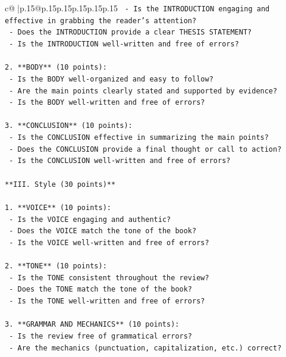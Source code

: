 \documentclass{article}
\begin{document}
{\begin{supertabular}{c@{$\;$}|p{.15\linewidth}@{}p{.15\linewidth}p{.15\linewidth}p{.15\linewidth}p{.15\linewidth}p{.15\linewidth}}
{{{\texttt{   {-} Is the INTRODUCTION engaging and effective in grabbing the reader's attention?} \\
\texttt{   {-} Does the INTRODUCTION provide a clear THESIS STATEMENT?} \\
\texttt{   {-} Is the INTRODUCTION well{-}written and free of errors?} \\
\\ 
\texttt{2. **BODY** (10 points):} \\
\texttt{   {-} Is the BODY well{-}organized and easy to follow?} \\
\texttt{   {-} Are the main points clearly stated and supported by evidence?} \\
\texttt{   {-} Is the BODY well{-}written and free of errors?} \\
\\ 
\texttt{3. **CONCLUSION** (10 points):} \\
\texttt{   {-} Is the CONCLUSION effective in summarizing the main points?} \\
\texttt{   {-} Does the CONCLUSION provide a final thought or call to action?} \\
\texttt{   {-} Is the CONCLUSION well{-}written and free of errors?} \\
\\ 
\texttt{**III. Style (30 points)**} \\
\\ 
\texttt{1. **VOICE** (10 points):} \\
\texttt{   {-} Is the VOICE engaging and authentic?} \\
\texttt{   {-} Does the VOICE match the tone of the book?} \\
\texttt{   {-} Is the VOICE well{-}written and free of errors?} \\
\\ 
\texttt{2. **TONE** (10 points):} \\
\texttt{   {-} Is the TONE consistent throughout the review?} \\
\texttt{   {-} Does the TONE match the tone of the book?} \\
\texttt{   {-} Is the TONE well{-}written and free of errors?} \\
\\ 
\texttt{3. **GRAMMAR AND MECHANICS** (10 points):} \\
\texttt{   {-} Is the review free of grammatical errors?} \\
\texttt{   {-} Are the mechanics (punctuation, capitalization, etc.) correct?} \\
}}}
\end{supertabular}}
\end{document}
